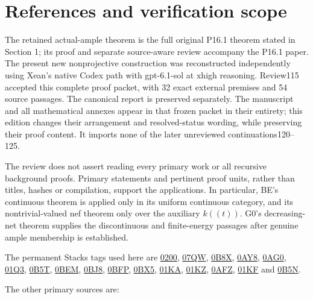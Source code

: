 \documentclass[
  10pt,
]{article}
\begin{document}
\section{References and verification
scope}\label{references-and-verification-scope}

The retained actual-ample theorem is the full original P16.1 theorem
stated in Section 1; its proof and separate source-aware review
accompany the P16.1 paper. The present new nonprojective construction
was reconstructed independently using Xean's native Codex path with
gpt-6.1-sol at xhigh reasoning. Review115 accepted this complete proof
packet, with 32 exact external premises and 54 source passages. The
canonical report is preserved separately. The manuscript and all
mathematical annexes appear in that frozen packet in their entirety;
this edition changes their arrangement and resolved-status wording,
while preserving their proof content. It imports none of the later
unreviewed continuations120--125.

The review does not assert reading every primary work or all recursive
background proofs. Primary statements and pertinent proof units, rather
than titles, hashes or compilation, support the applications. In
particular, BE's continuous theorem is applied only in its uniform
continuous category, and its nontrivial-valued nef theorem only over the
auxiliary \(k((t))\). G0's decreasing-net theorem supplies the
discontinuous and finite-energy passages after genuine ample membership
is established.

The permanent Stacks tags used here are
\href{https://stacks.math.columbia.edu/tag/0200}{0200},
\href{https://stacks.math.columbia.edu/tag/07QW}{07QW},
\href{https://stacks.math.columbia.edu/tag/0B8X}{0B8X},
\href{https://stacks.math.columbia.edu/tag/0AY8}{0AY8},
\href{https://stacks.math.columbia.edu/tag/0AG0}{0AG0},
\href{https://stacks.math.columbia.edu/tag/01Q3}{01Q3},
\href{https://stacks.math.columbia.edu/tag/0B5T}{0B5T},
\href{https://stacks.math.columbia.edu/tag/0BEM}{0BEM},
\href{https://stacks.math.columbia.edu/tag/0BJ8}{0BJ8},
\href{https://stacks.math.columbia.edu/tag/0BFP}{0BFP},
\href{https://stacks.math.columbia.edu/tag/0BX5}{0BX5},
\href{https://stacks.math.columbia.edu/tag/01KA}{01KA},
\href{https://stacks.math.columbia.edu/tag/01KZ}{01KZ},
\href{https://stacks.math.columbia.edu/tag/0AFZ}{0AFZ},
\href{https://stacks.math.columbia.edu/tag/01KF}{01KF} and
\href{https://stacks.math.columbia.edu/tag/0B5N}{0B5N}.

The other primary sources are:
\end{document}

